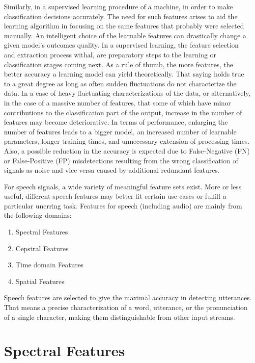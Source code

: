Similarly, in a supervised learning 
procedure of a machine, 
in order to make classification decisions accurately. 
The need for such features arises to 
aid the learning algorithm in focusing on the 
same features that probably were selected manually.
An intelligent choice of the learnable features 
\cite{7845025} 
can drastically change a given model's outcomes quality.
In a supervised learning, the 
feature selection and extraction process withal,
are preparatory steps to the learning or classification
stages coming next.
As a rule of thumb, the more features, the better accuracy
a learning model can yield theoretically\cite{lessIsMore}.
That saying holds true to a great degree
as long as often sudden fluctuations do not characterize the data.
In a case of heavy fluctuating characterizations of the data,
or alternatively, in the case of a 
massive number of features, 
that some of which have minor contributions 
to the classification part of the output,
increase in the number of features may become deteriorative.
In terms of performance, 
enlarging the number of features leads to a bigger model, 
an increased number of learnable parameters, 
longer training times, 
and unnecessary extension of processing times.
Also, a possible reduction in the accuracy is 
expected due to 
False-Negative (FN) or False-Positive (FP) 
misdetections resulting from the wrong 
classification of signals as noise and 
vice versa caused by additional redundant features.

For speech signals, a wide variety of 
meaningful feature sets exist. 
More or less useful, different speech features 
may better fit certain use-cases or fulfill 
a particular unerring task. 
Features for speech (including audio) 
are mainly from the following domains:
\begin{enumerate}
    \item Spectral Features
    \item Cepstral Features
    \item Time domain Features
    \item Spatial Features
\end{enumerate}

Speech features are selected 
to give the maximal accuracy in detecting utterances.
That means a precise characterization of a 
word, utterance, or the pronunciation of 
a single character, making them distinguishable
from other input streams. 

\section{Spectral Features}
